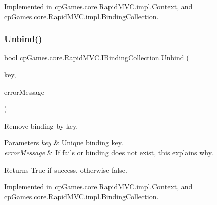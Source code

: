 Implemented in \mbox{\hyperlink{classcp_games_1_1core_1_1_rapid_m_v_c_1_1impl_1_1_context_a02ac3cc53b35b72269bf8c89d26b93ae}{cp\+Games.\+core.\+Rapid\+M\+V\+C.\+impl.\+Context}}, and \mbox{\hyperlink{classcp_games_1_1core_1_1_rapid_m_v_c_1_1impl_1_1_binding_collection_a6bfcca10ac176a8e624072e848412877}{cp\+Games.\+core.\+Rapid\+M\+V\+C.\+impl.\+Binding\+Collection}}.

\mbox{\label{interfacecp_games_1_1core_1_1_rapid_m_v_c_1_1_i_binding_collection_ab20c12c64a91e24e7685780dd64f1d87}} 
\subsubsection{\texorpdfstring{Unbind()}{Unbind()}}
{\footnotesize\ttfamily bool cp\+Games.\+core.\+Rapid\+M\+V\+C.\+I\+Binding\+Collection.\+Unbind (\begin{DoxyParamCaption}\item[{\mbox{\hyperlink{interfacecp_games_1_1core_1_1_rapid_m_v_c_1_1_i_binding_key}{I\+Binding\+Key}}}]{key,  }\item[{out string}]{error\+Message }\end{DoxyParamCaption})}



Remove binding by key. 


\begin{DoxyParams}{Parameters}
{\em key} & Unique binding key.\\
\hline
{\em error\+Message} & If fails or binding does not exist, this explains why.\\
\hline
\end{DoxyParams}
\begin{DoxyReturn}{Returns}
True if success, otherwise false.
\end{DoxyReturn}


Implemented in \mbox{\hyperlink{classcp_games_1_1core_1_1_rapid_m_v_c_1_1impl_1_1_context_a7cf9cfaa3957b4e48fdaccd726cbd8aa}{cp\+Games.\+core.\+Rapid\+M\+V\+C.\+impl.\+Context}}, and \mbox{\hyperlink{classcp_games_1_1core_1_1_rapid_m_v_c_1_1impl_1_1_binding_collection_a86fc516a730e0862d18c5a9cfb561f3c}{cp\+Games.\+core.\+Rapid\+M\+V\+C.\+impl.\+Binding\+Collection}}.




